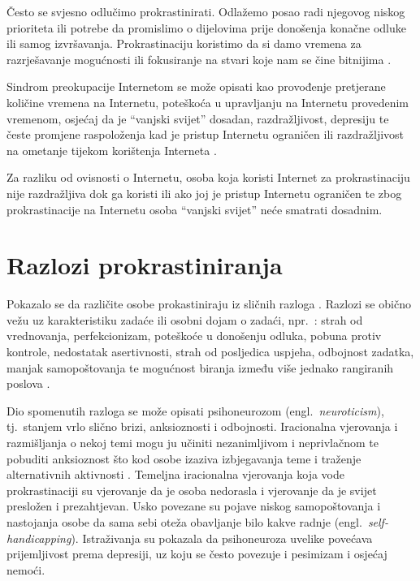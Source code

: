\documentclass[11pt,twocolumn,english]{article}
\newcommand{\engl}[1]{(engl.~\emph{#1})}
\begin{document}
Često se svjesno odlučimo prokrastinirati. Odlažemo posao radi njegovog niskog
prioriteta ili potrebe da promislimo o dijelovima prije donošenja konačne odluke
ili samog izvršavanja. Prokrastinaciju koristimo da si damo vremena za
razrješavanje mogućnosti ili fokusiranje na stvari koje nam se čine bitnijima
\cite{burka2004procrastination}.

Sindrom preokupacije Internetom se može opisati kao provođenje pretjerane
količine vremena na Internetu, poteškoća u upravljanju na Internetu provedenim
vremenom, osjećaj da je ``vanjski svijet'' dosadan, razdražljivost, depresiju
te česte promjene raspoloženja kad je pristup Internetu ograničen ili
razdražljivost na ometanje tijekom korištenja Interneta
\cite{yellowlees2007problematic}.
 
Za razliku od ovisnosti o Internetu, osoba koja koristi Internet za
prokrastinaciju nije razdražljiva dok ga koristi ili ako joj je pristup
Internetu ograničen te zbog prokrastinacije na Internetu osoba ``vanjski
svijet'' neće smatrati dosadnim.


\section{Razlozi prokrastiniranja}
Pokazalo se da različite osobe prokastiniraju iz sličnih razloga
\cite{steel2007nature}. Razlozi se obično vežu uz karakteristiku zadaće ili
osobni dojam o zadaći, npr.~\cite{solomon1984academic}: strah od vrednovanja,
perfekcionizam, poteškoće u donošenju odluka, pobuna protiv kontrole,
nedostatak asertivnosti, strah od posljedica uspjeha, odbojnost zadatka,
manjak samopoštovanja te mogućnost biranja između više jednako rangiranih
poslova \cite{o2001choice}.

Dio spomenutih razloga se može opisati psihoneurozom \engl{neuroticism},
tj.~stanjem vrlo slično brizi, anksioznosti i odbojnosti. Iracionalna vjerovanja
i razmišljanja o nekoj temi mogu ju učiniti nezanimljivom i neprivlačnom te
pobuditi anksioznost što kod osobe izaziva izbjegavanja teme i traženje
alternativnih aktivnosti \cite{steel2007nature}. Temeljna iracionalna vjerovanja koja vode
prokrastinaciji su vjerovanje da je osoba nedorasla i vjerovanje da je svijet
presložen i prezahtjevan. Usko povezane su pojave niskog samopoštovanja i
nastojanja osobe da sama sebi oteža obavljanje bilo kakve radnje
\engl{self-handicapping}. Istraživanja \cite{Caballero95neuro, Saklofske95neuro}
su pokazala da psihoneuroza uvelike povećava prijemljivost prema depresiji, uz
koju se često povezuje i pesimizam i osjećaj nemoći.
\end{document}
